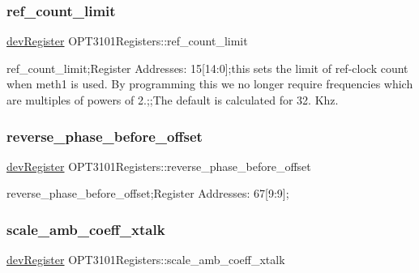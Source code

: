 \subsubsection{\texorpdfstring{ref\+\_\+count\+\_\+limit}{ref\_count\_limit}}
{\footnotesize\ttfamily \mbox{\hyperlink{classdev_register}{dev\+Register}} O\+P\+T3101\+Registers\+::ref\+\_\+count\+\_\+limit}



ref\+\_\+count\+\_\+limit;Register Addresses\+: 15\mbox{[}14\+:0\mbox{]};this sets the limit of ref-\/clock count when meth1 is used. By programming this we no longer require frequencies which are multiples of powers of 2.;;The default is calculated for 32. Khz. 

\mbox{\label{class_o_p_t3101_registers_afa400ade995f6cfe1f7c076216f2a724}} 
\subsubsection{\texorpdfstring{reverse\+\_\+phase\+\_\+before\+\_\+offset}{reverse\_phase\_before\_offset}}
{\footnotesize\ttfamily \mbox{\hyperlink{classdev_register}{dev\+Register}} O\+P\+T3101\+Registers\+::reverse\+\_\+phase\+\_\+before\+\_\+offset}



reverse\+\_\+phase\+\_\+before\+\_\+offset;Register Addresses\+: 67\mbox{[}9\+:9\mbox{]}; 

\mbox{\label{class_o_p_t3101_registers_adc47c94293601428c20e2422082b4969}} 
\subsubsection{\texorpdfstring{scale\+\_\+amb\+\_\+coeff\+\_\+xtalk}{scale\_amb\_coeff\_xtalk}}
{\footnotesize\ttfamily \mbox{\hyperlink{classdev_register}{dev\+Register}} O\+P\+T3101\+Registers\+::scale\+\_\+amb\+\_\+coeff\+\_\+xtalk}



